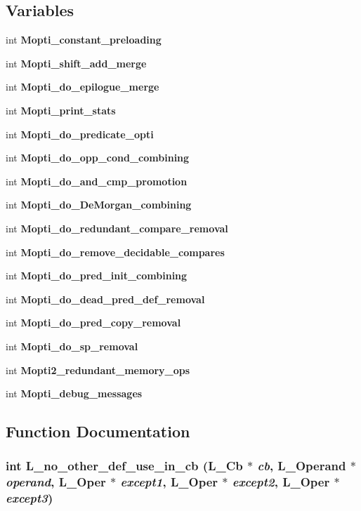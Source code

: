 \subsection*{Variables}
\begin{CompactItemize}
\item 
int \bf{Mopti\_\-constant\_\-preloading}
\item 
int \bf{Mopti\_\-shift\_\-add\_\-merge}
\item 
int \bf{Mopti\_\-do\_\-epilogue\_\-merge}
\item 
int \bf{Mopti\_\-print\_\-stats}
\item 
int \bf{Mopti\_\-do\_\-predicate\_\-opti}
\item 
int \bf{Mopti\_\-do\_\-opp\_\-cond\_\-combining}
\item 
int \bf{Mopti\_\-do\_\-and\_\-cmp\_\-promotion}
\item 
int \bf{Mopti\_\-do\_\-De\-Morgan\_\-combining}
\item 
int \bf{Mopti\_\-do\_\-redundant\_\-compare\_\-removal}
\item 
int \bf{Mopti\_\-do\_\-remove\_\-decidable\_\-compares}
\item 
int \bf{Mopti\_\-do\_\-pred\_\-init\_\-combining}
\item 
int \bf{Mopti\_\-do\_\-dead\_\-pred\_\-def\_\-removal}
\item 
int \bf{Mopti\_\-do\_\-pred\_\-copy\_\-removal}
\item 
int \bf{Mopti\_\-do\_\-sp\_\-removal}
\item 
int \bf{Mopti2\_\-redundant\_\-memory\_\-ops}
\item 
int \bf{Mopti\_\-debug\_\-messages}
\end{CompactItemize}


\subsection{Function Documentation}
\subsubsection{\setlength{\rightskip}{0pt plus 5cm}int L\_\-no\_\-other\_\-def\_\-use\_\-in\_\-cb (L\_\-Cb $\ast$ {\em cb}, L\_\-Operand $\ast$ {\em operand}, L\_\-Oper $\ast$ {\em except1}, L\_\-Oper $\ast$ {\em except2}, L\_\-Oper $\ast$ {\em except3})}\label{mia__opti_8h_efb3522868e2146cffcb05da824b08cb}




